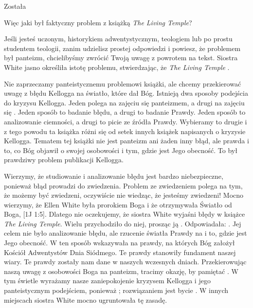 Została 

Więc jaki był faktyczny problem z książką \textit{The Living Temple}?

Jeśli jesteś uczonym, historykiem adwentystycznym, teologiem lub po prostu studentem teologii, zanim udzielisz prostej odpowiedzi i powiesz, że problemem był panteizm, chcielibyśmy zwrócić Twoją uwagę z powrotem na tekst. Siostra White jasno określiła istotę problemu, stwierdzając, że \textit{The Living Temple} .

Nie zaprzeczamy panteistycznemu problemowi książki, ale chcemy przekierować uwagę z błędu Kellogga na światło, które dał Bóg. Istnieją dwa sposoby podejścia do kryzysu Kellogga. Jeden polega na zajęciu się panteizmem, a drugi na zajęciu się . Jeden sposób to badanie błędu, a drugi to badanie Prawdy. Jeden sposób to analizowanie ciemności, a drugi to picie ze źródła Prawdy. Wybieramy to drugie i z tego powodu ta książka różni się od setek innych książek napisanych o kryzysie Kellogga. Tematem tej książki nie jest panteizm ani żaden inny błąd, ale prawda i to, co Bóg objawił o swojej osobowości i tym, gdzie jest Jego obecność. To był prawdziwy problem publikacji Kellogga.

Wierzymy, że studiowanie i analizowanie błędu jest bardzo niebezpieczne, ponieważ błąd prowadzi do zwiedzenia. Problem ze zwiedzeniem polega na tym, że możemy być zwiedzeni, oczywiście nie wiedząc, że jesteśmy zwiedzeni! Mocno wierzymy, że Ellen White była prorokiem Boga i że otrzymywała Światło od Boga, [1J 1:5]. Dlatego nie oczekujemy, że siostra White wyjaśni błędy w książce \textit{The Living Temple}. Wielu przychodziło do niej, prosząc ją . Odpowiadała: . Jej celem nie było analizowanie błędu, ale rzucenie światła Prawdy na  i to, gdzie jest Jego obecność. W ten sposób wskazywała na prawdy, na których Bóg założył Kościół Adwentystów Dnia Siódmego. Te prawdy stanowiły fundament naszej wiary. Te prawdy zostały nam dane w naszych wczesnych dniach. Przekierowując naszą uwagę z osobowości Boga na panteizm, tracimy okazję, by pamiętać . W tym świetle wyrażamy nasze zaniepokojenie kryzysem Kellogga i jego panteistycznym podejściem, ponieważ ; rozwiązaniem jest bycie . W innych miejscach siostra White mocno ugruntowała tę zasadę.

